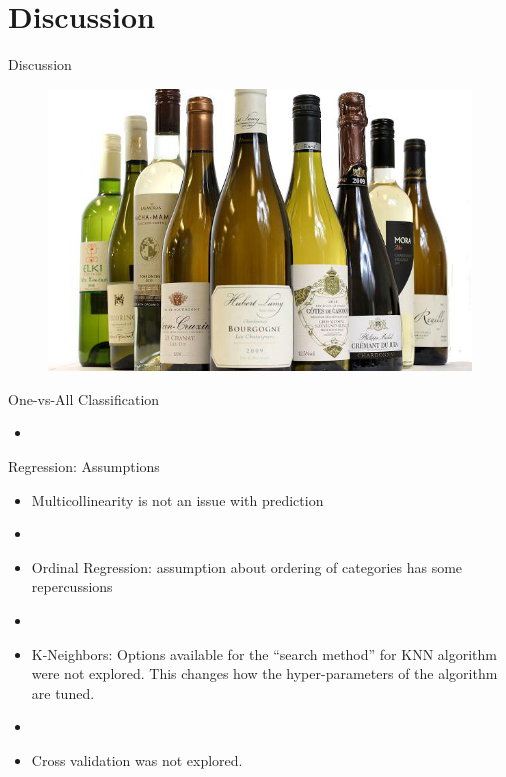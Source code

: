 \documentclass{beamer}
\begin{document}
\section{Discussion}
\begin{frame}{Discussion}
	\begin{figure}
		\centering
		\includegraphics[width=\textwidth]{../images/wines.jpg}
	\end{figure}
\end{frame}

\begin{frame}{One-vs-All Classification}
	\begin{itemize}
	\item 
	\end{itemize}

\end{frame}


\begin{frame}{Regression: Assumptions}
	\begin{itemize}
	\item Multicollinearity is not an issue with prediction
	\item[]
	\item Ordinal Regression: assumption about ordering of categories has some repercussions
	\item[]
	\item K-Neighbors: Options available for the ``search method'' for KNN algorithm were not explored. This changes how the hyper-parameters of the algorithm are tuned.
	\item[]
	\item Cross validation was not explored.
	\end{itemize}
\end{frame}
\end{document}

